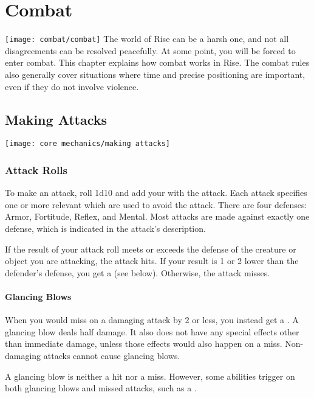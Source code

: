 \chapter{Combat}\label{Combat}
    \texttt{[image: combat/combat]}
    The world of Rise can be a harsh one, and not all disagreements can be resolved peacefully.
    At some point, you will be forced to enter combat.
    This chapter explains how combat works in Rise.
    The combat rules also generally cover situations where time and precise positioning are important, even if they do not involve violence.

\section{Making Attacks}\label{Attacks}
    \texttt{[image: core mechanics/making attacks]}

    \subsection{Attack Rolls}\label{Attack Rolls}
        To make an attack, roll 1d10 and add your  with the attack.
        Each attack specifies one or more relevant  which are used to avoid the attack.
        There are four defenses: Armor, Fortitude, Reflex, and Mental.
        Most attacks are made against exactly one defense, which is indicated in the attack's description.

        If the result of your attack roll meets or exceeds the defense of the creature or object you are attacking, the attack hits.
        If your result is 1 or 2 lower than the defender's defense, you get a  (see below).
        Otherwise, the attack misses.

        \subsubsection{Glancing Blows}\label{Glancing Blows}
            When you would miss on a damaging attack by 2 or less, you instead get a .
            A glancing blow deals half damage.
            It also does not have any special effects other than immediate damage, unless those effects would also happen on a miss.
            Non-damaging attacks cannot cause glancing blows.

            A glancing blow is neither a hit nor a miss.
            However, some abilities trigger on both glancing blows and missed attacks, such as a .

